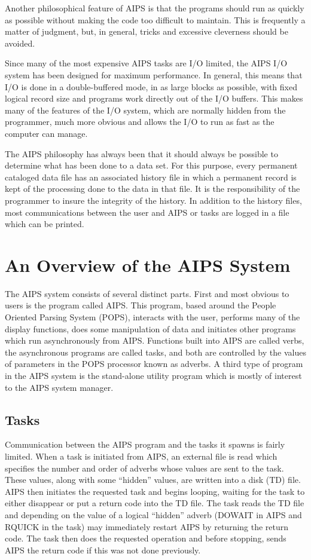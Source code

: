 Another philosophical feature of AIPS is that the programs should run
as quickly as possible without making the code too difficult to
maintain.  This is frequently a matter of judgment, but, in general,
tricks and excessive cleverness should be avoided.

Since many of the most expensive AIPS tasks are I/O limited, the AIPS
I/O system has been designed  for maximum performance.  In general,
this means that I/O is done in a double-buffered mode, in as large
blocks as possible, with fixed logical record size and programs work
directly out of the I/O buffers.  This makes many of the features of
the I/O system, which are normally hidden from the programmer, much
more obvious and allows the I/O to run as fast as the computer can
manage.

The AIPS philosophy has always been that it should always be possible
to determine what has been done to a data set.  For this purpose,
every permanent cataloged data file has an associated history file in
which a permanent record is kept of the processing done to the data in
that file. It is the responsibility of the programmer to insure the
integrity of the history.  In addition to the history files, most
communications between the user and AIPS or tasks are logged in a file
which can be printed.


\section{An Overview of the AIPS System}
The AIPS system consists of several distinct parts.  First and most
obvious to users is the program called AIPS.  This program, based
around the People Oriented Parsing System (POPS), interacts with
the user, performs many of the display functions, does some
manipulation of data and initiates other programs which run
asynchronously from AIPS.  Functions built into AIPS are called verbs,
the asynchronous programs are called tasks, and both are controlled by
the values of parameters in the POPS processor known as adverbs.  A
third type of program in the AIPS system is the stand-alone utility
program which is mostly of interest to the AIPS system manager.

\subsection{Tasks}
Communication between the AIPS program and the tasks it spawns is
fairly limited.  When a task is initiated from AIPS, an external file
is read which specifies the number and order of adverbs whose values
are sent to the task.  These values, along with some ``hidden'' values,
are written into a disk (TD) file.  AIPS then initiates the requested
task and begins looping, waiting for the task to either disappear or
put a return code into the TD file. The task reads the TD file and
depending on the value of a logical ``hidden'' adverb (DOWAIT in AIPS
and RQUICK in the task) may immediately restart AIPS by returning the
return code.  The task then does the requested operation and before
stopping, sends AIPS the return code if this was not done previously.


